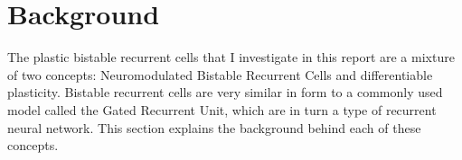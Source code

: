 \section*{Background}

The plastic bistable recurrent cells that I investigate in this report are a mixture of two concepts: Neuromodulated Bistable Recurrent Cells\cite{vecoven2021brc} and differentiable plasticity\cite{miconi2018diffplas}. Bistable recurrent cells are very similar in form to a commonly used model called the Gated Recurrent Unit\cite{cho2014gru}, which are in turn a type of recurrent neural network. This section explains the background behind each of these concepts.




